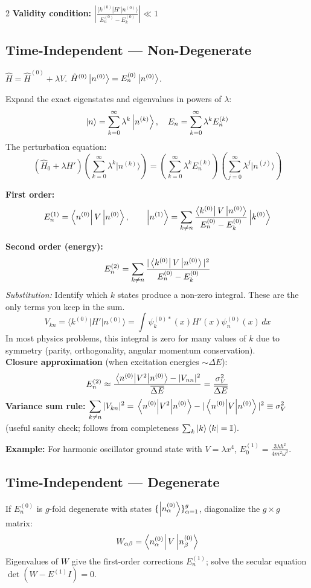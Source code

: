 \documentclass[9pt,a4paper]{article} %
\newcommand{\Hhat}{\hat{H}}
\newcommand{\Id}{\mathbb{I}}
\begin{document}
\begin{multicols}{2}
\textbf{Validity condition:} \(\left| \frac{\langle k^{(0)} | H' | n^{(0)} \rangle}{E_n^{(0)} - E_k^{(0)}} \right| \ll 1\)

\subsection{Time-Independent — Non-Degenerate}
$\Hhat=\Hhat^{(0)}+\lambda V$.  $\Hhat^{(0)}\ket{n^{(0)}}=E_n^{(0)}\ket{n^{(0)}}$.

Expand the exact eigenstates and eigenvalues in powers of $\lambda$:
\[
\ket{n}=\sum_{k=0}^\infty\lambda^k\ket{n^{(k)}},\quad E_n=\sum_{k=0}^\infty\lambda^k E_n^{(k)}
\]
The perturbation equation:
\[
(\Hhat_0 + \lambda H') \left( \sum_{k=0}^\infty \lambda^k |n^{(k)}\rangle \right) = \left( \sum_{k=0}^\infty \lambda^k E_n^{(k)} \right) \left( \sum_{j=0}^\infty \lambda^j |n^{(j)}\rangle \right)
\]

\textbf{First order:}
\[
E_n^{(1)}=\bra{n^{(0)}}V\ket{n^{(0)}},\qquad
\ket{n^{(1)}}=\sum_{k\ne n}\frac{\bra{k^{(0)}}V\ket{n^{(0)}}}{E_n^{(0)}-E_k^{(0)}}\ket{k^{(0)}}
\]

\textbf{Second order (energy):}
\[
E_n^{(2)}=\sum_{k\ne n}\frac{|\bra{k^{(0)}}V\ket{n^{(0)}}|^2}{E_n^{(0)}-E_k^{(0)}}
\]
{\footnotesize \textit{Substitution:} Identify which $k$ states produce a non-zero integral. These are the only terms you keep in the sum.}
\[ V_{kn} = \langle k^{(0)} | H' | n^{(0)} \rangle = \int \psi_k^{(0)*}(x) H'(x) \psi_n^{(0)}(x) \, dx \]
{\footnotesize In most physics problems, this integral is zero for many values of $k$ due to symmetry (parity, orthogonality, angular momentum conservation).}\\

\textbf{Closure approximation} (when excitation energies $\sim\overline{\Delta E}$):
\[
  E_n^{(2)} \approx \frac{\ev{V^2}{n^{(0)}} - |V_{nn}|^2}{\overline{\Delta E}}
  = \frac{\sigma_V^2}{\overline{\Delta E}}
\]
\textbf{Variance sum rule:}
$\displaystyle\sum_{k\neq n}|V_{kn}|^2 = \ev{V^2}{n^{(0)}} - |\ev{V}{n^{(0)}}|^2 \equiv \sigma_V^2$
(useful sanity check; follows from completeness $\sum_k\ket{k}\bra{k}=\Id$).

\textbf{Example:} For harmonic oscillator ground state with $V = \lambda x^4$, $E_0^{(1)} = \frac{3\lambda \hbar^2}{4 m^2 \omega^2}$.


\subsection{Time-Independent — Degenerate}
If $E_n^{(0)}$ is $g$-fold degenerate with states $\{\ket{n^{(0)}_\alpha}\}_{\alpha=1}^{g}$, diagonalize the $g\times g$ matrix:
\[
W_{\alpha\beta}=\bra{n^{(0)}_\alpha}V\ket{n^{(0)}_\beta}
\]
Eigenvalues of $W$ give the first-order corrections $E_n^{(1)}$; solve the secular equation $\det(W - E^{(1)} I) = 0$.


\end{multicols}
\end{document}

